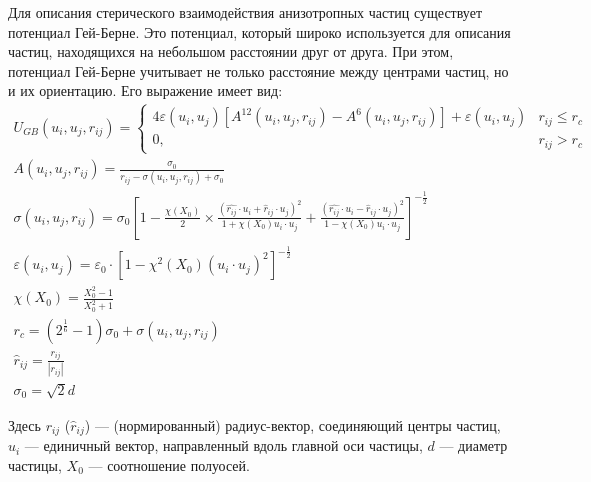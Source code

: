 \documentclass[a4paper,14pt]{extarticle}
\newcommand{\abs}[1]{\left\vert #1 \right\vert}
\begin{document}
    Для описания стерического взаимодействия анизотропных частиц существует потенциал Гей-Берне. Это потенциал, который широко используется для описания частиц, находящихся на небольшом расстоянии друг от друга. При этом, потенциал Гей-Берне учитывает не только расстояние между центрами частиц, но и их ориентацию. Его выражение имеет вид:
    \begin{gather*}
        U_{GB} (u_i, u_j, r_{ij}) =
        \begin{cases}
            4 \varepsilon(u_i, u_j)
            [A^{12}(u_i, u_j, r_{ij}) - A^6(u_i, u_j, r_{ij})]
            + \varepsilon(u_i, u_j)
            & r_{ij} \leqslant r_c \\
            0, & r_{ij} > r_c
        \end{cases} \\
        A(u_i, u_j, r_{ij})
        = \frac{\sigma_0}{r_{ij} - \sigma(u_i, u_j, r_{ij}) + \sigma_0} \\
        \sigma(u_i, u_j, r_{ij})
        = \sigma_0 \left[
        1 - \frac{\chi(X_0)}{2}
        \times \frac{(\hat{r_{ij}}\cdot u_i
        + \hat{r}_{ij}\cdot u_j)^2}{1 + \chi(X_0) u_i \cdot u_j}
        + \frac{(\hat{r_{ij}}\cdot u_i
        - \hat{r}_{ij}\cdot u_j)^2}{1 - \chi(X_0) u_i \cdot u_j}
        \right]^{-\frac12} \\
        \varepsilon(u_i, u_j)
        = \varepsilon_0 \cdot [1 - \chi^2(X_0) (u_i \cdot u_j)^2]^{-\frac12} \\
        \chi(X_0) =
        \frac{X_0^2-1}{X_0^2+1} \\
        r_c = (2^{\frac16} - 1) \sigma_0 + \sigma(u_i, u_j, r_{ij}) \\
        \hat{r}_{ij} = \frac{r_{ij}}{\abs{r_{ij}}} \\
        \sigma_0 = \sqrt{2} d
    \end{gather*}

    Здесь $r_{ij}$ ($\hat{r}_{ij}$) --- (нормированный) радиус-вектор, соединяющий центры частиц, $u_i$ --- единичный вектор, направленный вдоль главной  оси частицы, $d$ --- диаметр частицы, $X_0$ --- соотношение полуосей.
\end{document}
